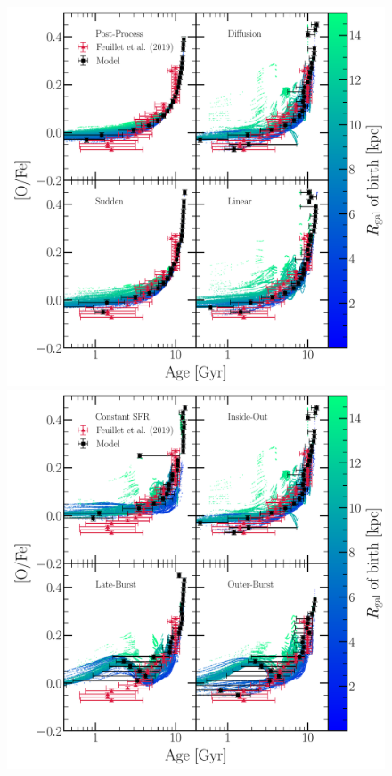 \documentclass[draft2.tex]{subfiles}
\begin{document}
\begin{figure} 
\centering 
\includegraphics[scale = 0.34]{age_ofe_migration_comparison.pdf} 
\includegraphics[scale = 0.34]{age_ofe_sfh_comparison.pdf} 

\end{figure}
\end{document}
